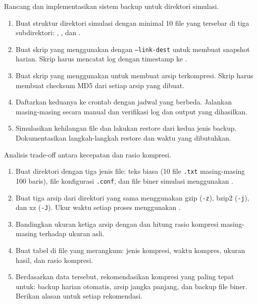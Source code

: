 \begin{exercisebox}
Rancang dan implementasikan sistem backup untuk direktori simulasi.
\begin{enumerate}
    \item Buat struktur direktori simulasi dengan minimal 10 file yang tersebar
        di tiga subdirektori: , , dan .
    \item Buat skrip  yang menggunakan  dengan
        \texttt{--link-dest} untuk membuat snapshot harian. Skrip harus mencatat
        log dengan timestamp ke .
    \item Buat skrip  yang menggunakan 
        untuk membuat arsip terkompresi. Skrip harus membuat checksum MD5 dari
        setiap arsip yang dibuat.
    \item Daftarkan keduanya ke crontab dengan jadwal yang berbeda. Jalankan
        masing-masing secara manual dan verifikasi log dan output yang dihasilkan.
    \item Simulasikan kehilangan file dan lakukan restore dari kedua jenis backup.
        Dokumentasikan langkah-langkah restore dan waktu yang dibutuhkan.
\end{enumerate}
\end{exercisebox}

\begin{exercisebox}
Analisis trade-off antara kecepatan dan rasio kompresi.
\begin{enumerate}
    \item Buat direktori dengan tiga jenis file: teks biasa (10 file \texttt{.txt}
        masing-masing 100 baris), file konfigurasi \texttt{.conf}, dan file biner
        simulasi menggunakan .
    \item Buat tiga arsip dari direktori yang sama menggunakan gzip (\texttt{-z}),
        bzip2 (\texttt{-j}), dan xz (\texttt{-J}). Ukur waktu setiap proses
        menggunakan .
    \item Bandingkan ukuran ketiga arsip dengan  dan hitung rasio
        kompresi masing-masing terhadap ukuran asli.
    \item Buat tabel di file  yang merangkum: jenis
        kompresi, waktu kompres, ukuran hasil, dan rasio kompresi.
    \item Berdasarkan data tersebut, rekomendasikan kompresi yang paling tepat
        untuk: backup harian otomatis, arsip jangka panjang, dan backup file biner.
        Berikan alasan untuk setiap rekomendasi.
\end{enumerate}
\end{exercisebox}


